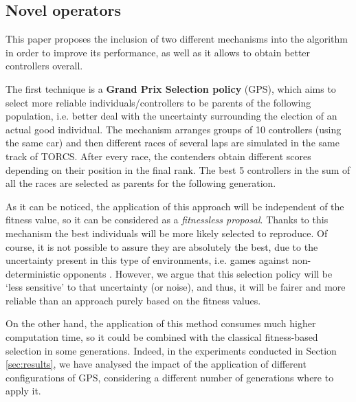 \documentclass[10pt,journal,compsoc]{IEEEtran}
\begin{document}

\subsection{Novel operators}


This paper proposes the inclusion of two different mechanisms into the algorithm in order to improve its performance, as well as it allows to obtain better controllers overall.

The first technique is a \textbf{Grand Prix Selection policy} (GPS), which aims to select more reliable individuals/controllers to be parents of the following population, i.e. better deal with the uncertainty surrounding the election of an actual good individual. The mechanism arranges groups of 10 controllers (using the same car) and then different races of several laps are simulated in the same track of TORCS. After every race, the contenders obtain different scores depending on their position in the final rank. The best 5 controllers in the sum of all the races are selected as parents for the following generation. 

As it can be noticed, the application of this approach will be independent of the fitness value, so it can be considered as a \textit{fitnessless proposal}.
Thanks to this mechanism the best individuals will be more likely
selected to reproduce. Of course, it is not possible to assure they
are absolutely the best, due to the uncertainty present in this type
of environments, i.e. games against non-deterministic opponents
\cite{merelo2016statistical}. However, we argue that this selection
policy will be `less sensitive' to that uncertainty (or noise), and
thus, it will be fairer and more reliable than an approach purely
based on the fitness values.  

On the other hand, the application of this method consumes much higher computation time, so it could be combined with the classical fitness-based selection in some generations. Indeed, in the experiments conducted in Section \ref{sec:results}, we have analysed the impact of the application of different configurations of GPS, considering a different number of generations where to apply it.
\end{document}

